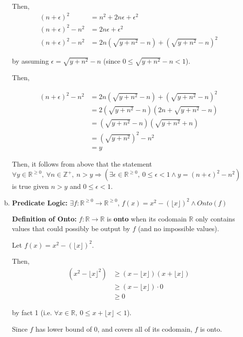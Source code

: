 \documentclass[12pt]{article}
\begin{document}
\begin{enumerate}[a.]
    Then,
    \setcounter{equation}{0}
    \begin{align}
        (n + \epsilon)^2 &= n^2 + 2n\epsilon + \epsilon^2\\
        (n + \epsilon)^2 - n^2 &= 2n\epsilon + \epsilon^2\\
        (n + \epsilon)^2 - n^2 &= 2n(\sqrt{y+n^2}-n) + (\sqrt{y + n^2} - n)^2
    \end{align}

    by assuming $\epsilon = \sqrt{y+n^2} - n$ (since $0 \leq \sqrt{y+n^2} - n < 1$).

    \bigskip

    Then,

    \begin{align}
        (n + \epsilon)^2 - n^2 &= 2n(\sqrt{y+n^2}-n) + (\sqrt{y + n^2} - n)^2\\
        &= 2(\sqrt{y+n^2} - n)(2n + \sqrt{y+n^2} - n)\\
        &= (\sqrt{y+n^2} - n)(\sqrt{y+n^2} + n)\\
        &= (\sqrt{y + n^2})^2 - n^2\\
        &= y
    \end{align}

    Then, it follows from above that the statement $\forall y \in \mathbb{R}^{\geq 0},\:
    \forall n \in \mathbb{Z}^{+},\:n>y \Rightarrow (\exists \epsilon \in \mathbb{R}^{\geq 0},\:
    0 \leq \epsilon < 1 \land y = (n + \epsilon)^2 - n^2)$ is true given $n>y$ and
    $0 \leq \epsilon < 1$.

    \item

    \textbf{Predicate Logic:} $\exists f:\mathbb{R}^{\geq 0} \to \mathbb{R}^{\geq 0}$,
    $f(x) = x^2 - (\lfloor x \rfloor)^2 \land Onto(f)$

    \textbf{Definition of Onto:} $f:\mathbb{R} \to \mathbb{R}$ is \textbf{onto}
    when its codomain $\mathbb{R}$ only contains values that could possibly be output
    by $f$ (and no impossible values).

    \bigskip

    Let $f(x) = x^2 - (\lfloor x \rfloor)^2$.

    \bigskip

    Then,
    \setcounter{equation}{0}
    \begin{align}
        (x^2 - \lfloor x \rfloor^2) &\geq (x - \lfloor x \rfloor)(x + \lfloor x \rfloor)\\
        &\geq (x - \lfloor x \rfloor) \cdot 0\\
        &\geq 0
    \end{align}

    by fact 1 (i.e. $\forall x \in \mathbb{R},\: 0 \leq x + \lfloor x \rfloor < 1$).

    \bigskip

    Since $f$ has lower bound of 0, and covers all of its codomain, $f$ is onto.

\end{enumerate}
\end{document}
